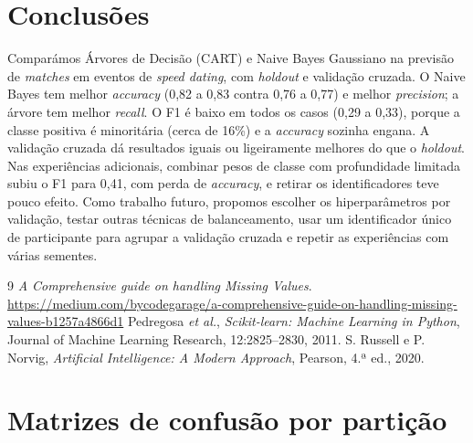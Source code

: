 \documentclass[12pt,a4paper]{article}
\begin{document}
\clearpage
\section{Conclusões}

Comparámos Árvores de Decisão (CART) e Naive Bayes Gaussiano na previsão de \emph{matches} em eventos de \emph{speed dating}, com \emph{holdout} e validação cruzada. O Naive Bayes tem melhor \emph{accuracy} (0,82 a 0,83 contra 0,76 a 0,77) e melhor \emph{precision}; a árvore tem melhor \emph{recall}. O F1 é baixo em todos os casos (0,29 a 0,33), porque a classe positiva é minoritária (cerca de 16\%) e a \emph{accuracy} sozinha engana. A validação cruzada dá resultados iguais ou ligeiramente melhores do que o \emph{holdout}. Nas experiências adicionais, combinar pesos de classe com profundidade limitada subiu o F1 para 0,41, com perda de \emph{accuracy}, e retirar os identificadores teve pouco efeito. Como trabalho futuro, propomos escolher os hiperparâmetros por validação, testar outras técnicas de balanceamento, usar um identificador único de participante para agrupar a validação cruzada e repetir as experiências com várias sementes.

\begin{thebibliography}{9}
 \emph{A Comprehensive guide on handling Missing Values}. \url{https://medium.com/bycodegarage/a-comprehensive-guide-on-handling-missing-values-b1257a4866d1}\hfill\null
{} Pedregosa \emph{et al.}, \emph{Scikit-learn: Machine Learning in Python}, Journal of Machine Learning Research, 12:2825--2830, 2011.
 S. Russell e P. Norvig, \emph{Artificial Intelligence: A Modern Approach}, Pearson, 4.ª ed., 2020.
\end{thebibliography}

\clearpage
\appendix
\section{Matrizes de confusão por partição}
\label{app:cm}
\end{document}
